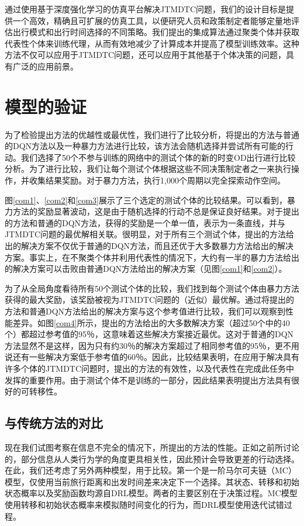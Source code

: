 通过使用基于深度强化学习的仿真平台解决JTMDTC问题，我们的设计目标是提供一个高效，精确且可扩展的仿真工具，以便研究人员和政策制定者能够定量地评估出行模式和出行时间选择的不同策略。我们提出的集成算法通过聚类个体并获取代表性个体来训练代理，从而有效地减少了计算成本并提高了模型训练效率。这种方法不仅可以应用于JTMDTC问题，还可以应用于其他基于个体决策的问题，具有广泛的应用前景。

\section{模型的验证}

为了检验提出方法的优越性或最优性，我们进行了比较分析，将提出的方法与普通的DQN方法以及一种暴力方法进行比较，该方法会随机选择并尝试所有可能的行动。我们选择了50个不参与训练的网络中的测试个体的新的时变OD出行进行比较分析。为了进行比较，我们让每个测试个体根据这些不同决策制定者之一来执行操作，并收集结果奖励。对于暴力方法，执行1,000个周期以完全探索动作空间。

图\ref{com1}、\ref{com2}和\ref{com3}展示了三个选定的测试个体的比较结果。可以看到，暴力方法的奖励显著波动，这是由于随机选择的行动不总是保证良好结果。对于提出的方法和普通的DQN方法，获得的奖励是一个单一值，表示为一条直线，并与JTMDTC问题的最优解相关联。很明显，对于所有三个测试个体，提出的方法给出的解决方案不仅优于普通的DQN方法，而且还优于大多数暴力方法给出的解决方案。事实上，在不聚类个体并利用代表性的情况下，大约有一半的暴力方法给出的解决方案可以击败由普通DQN方法给出的解决方案（见图\ref{com1}和\ref{com2}）。

为了从全局角度看待所有50个测试个体的比较，我们找到每个测试个体由暴力方法获得的最大奖励，该奖励被视为JTMDTC问题的（近似）最优解。通过将提出的方法和普通DQN方法给出的解决方案与这个参考值进行比较，我们可以观察到性能差异。如图\ref{com4}所示，提出的方法给出的大多数解决方案（超过50个中的40个）都超过参考值的95％，这意味着这些解决方案接近最优。这对于普通的DQN方法显然不是这样，因为只有约30％的解决方案超过了相同参考值的95％，更不用说还有一些解决方案低于参考值的60％。因此，比较结果表明，在应用于解决具有许多个体的JTMDTC问题时，提出的方法的有效性，以及代表性在完成此任务中发挥的重要作用。由于测试个体不是训练的一部分，因此结果表明提出方法具有很好的可转移性。

\subsection{与传统方法的对比}

现在我们试图考察在信息不完全的情况下，所提出的方法的性能。正如之前所讨论的，部分信息从人类行为学的角度更具相关性，因此预计会导致更差的行动选择。在此，我们还考虑了另外两种模型，用于比较。第一个是一阶马尔可夫链（MC）模型，仅使用当前旅行距离和出发时间差来决定下一个选择。其状态、转移和初始状态概率以及奖励函数均源自DRL模型。两者的主要区别在于决策过程。MC模型使用转移和初始状态概率来模拟随时间变化的行为，而DRL模型使用迭代试错过程。

